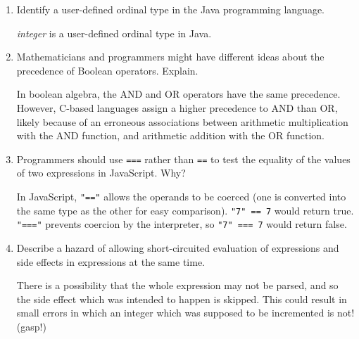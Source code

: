 \begin{enumerate}
\begin{answer}
    \end{answer}

  \item Identify a user-defined ordinal type in the Java programming
    language.

  \begin{answer}

    \textit{integer} is a user-defined ordinal type in Java.

    \end{answer}

  \item Mathematicians and programmers might have different ideas
    about the precedence of Boolean operators. Explain.

  \begin{answer}

    In boolean algebra, the AND and OR operators have the same
    precedence. However, C-based languages assign a higher precedence
    to AND than OR, likely because of an erroneous associations
    between arithmetic multiplication with the AND function, and
    arithmetic addition with the OR function.

    \end{answer}

  \item Programmers should use \verb+===+ rather than \verb+==+ to
    test the equality of the values of two expressions in JavaScript. Why?

  \begin{answer}

    In JavaScript, \verb+"=="+ allows the operands to be coerced (one
    is converted into the same type as the other for easy
    comparison). \verb+"7" == 7+ would return true. \verb+"==="+
    prevents coercion by the interpreter, so \verb+"7" === 7+ would
    return false.

    \end{answer}

  \item Describe a hazard of allowing short-circuited evaluation
    of expressions and side effects in expressions at the same time.

  \begin{answer}

    There is a possibility that the whole expression may not be
    parsed, and so the side effect which was intended to happen is
    skipped. This could result in small errors in which an integer
    which was supposed to be incremented is not! (gasp!)


\end{answer}
\end{enumerate}
